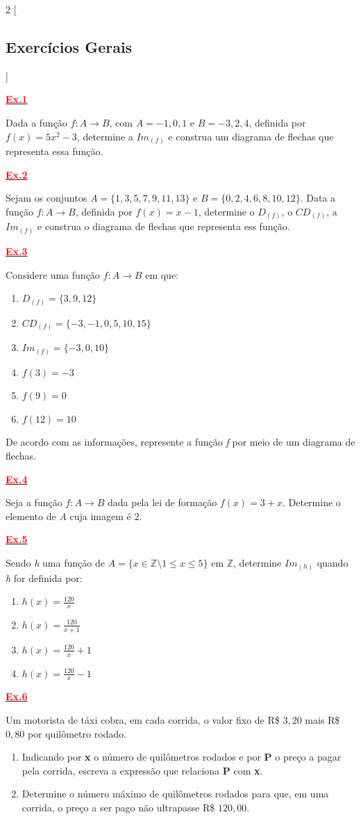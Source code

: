 \documentclass[12pt]{report}
\newcommand{\ex}[1]{\hypertarget{ex#1}{\noindent\hyperlink{gab#1}{\textcolor{red}{\textbf{Ex.#1}}}}}
\begin{document}
\begin{multicols}{2}
[
\begin{center}
\section*{Exercícios Gerais}
\end{center}
]
\changefontsizes[9pt]{9pt}

\ex{1} Dada a função $f:A \rightarrow B$, com $A={-1,0,1}$ e $B={-3,2,4}$, definida por $f(x) = 5x^2 - 3$, determine a $Im_{(f)}$ e construa um diagrama de flechas que representa essa função.

\ex{2} Sejam os conjuntos $A=\{1,3,5,7,9,11,13\}$ e $B=\{0,2,4,6,8,10,12\}$. Data a função $f:A \rightarrow B$, definida por $f(x) = x - 1$, determine o $D_{(f)}$, o $CD_{(f)}$, a $Im_{(f)}$ e construa o diagrama de flechas que representa ess função.

\ex{3} Considere uma função $f:A \rightarrow B$ em que:
\begin{enumerate}[label=\alph*)]
	\item $D_{(f)} = \{3,9,12\}$
	\item $CD_{(f)} = \{-3,-1,0,5,10,15\}$
	\item $Im_{(f)} = \{-3,0,10\}$
	\item $f(3) = -3$
	\item $f(9) = 0$
	\item $f(12) = 10$
\end{enumerate}
De acordo com as informações, represente a função \textit{f} por meio de um diagrama de flechas.

\ex{4} Seja a função $f:A \rightarrow B$ dada pela lei de formação $f(x)=3+x$. Determine o elemento de \textit{A} cuja imagem é $2$.

\ex{5} Sendo \textit{h} uma função de $A=\{x \in \mathbb{Z} \setminus 1 \leqslant x \leqslant 5\}$ em $\mathbb{Z}$, determine $Im_{(h)}$ quando \textit{h} for definida por:
\begin{enumerate}[label=\alph*)]
	\item $h(x) = \frac{120}{x} $
	\item $h(x) = \frac{120}{x+1} $
	\item $h(x) = \frac{120}{x}+1 $
	\item $h(x) = \frac{120}{x}-1 $
\end{enumerate}
	

\ex{6} Um motorista de táxi cobra, em cada corrida, o valor fixo de R\$ $3,20$ mais R\$ $0,80$ por quilômetro rodado.
\begin{enumerate}[label=\alph*)]
	\item Indicando por \textbf{x} o número de quilômetros rodados e por \textbf{P} o preço a pagar pela corrida, escreva a expressão que relaciona \textbf{P} com \textbf{x}. 
	\item Determine o número máximo de quilômetros rodados para que, em uma corrida, o preço a ser pago não ultrapasse R\$ $120,00$.
\end{enumerate}


\end{multicols}
\end{document}
